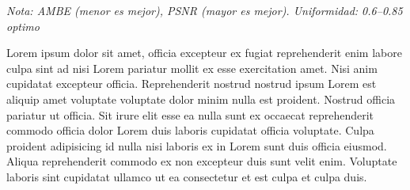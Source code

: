 \documentclass[sigchi]{acmart}
\begin{document}
\begin{table}[htbp]
	\centering
	\caption{Comparación estadística de los algoritmos de mejora de contraste}
	\label{tab:comparacion}
	\small

	\vspace{0.5em}
	\footnotesize%
	\textit{Nota: AMBE (menor es mejor), PSNR (mayor es mejor). Uniformidad: 0.6–0.85 optimo}
\end{table}

Lorem ipsum dolor sit amet, officia excepteur ex fugiat reprehenderit enim labore culpa sint ad
nisi Lorem pariatur mollit ex esse exercitation amet. Nisi anim cupidatat excepteur officia.
Reprehenderit nostrud nostrud ipsum Lorem est aliquip amet voluptate voluptate dolor minim
nulla est proident. Nostrud officia pariatur ut officia. Sit irure elit esse ea nulla sunt ex
occaecat reprehenderit commodo officia dolor Lorem duis laboris cupidatat officia voluptate.
Culpa proident adipisicing id nulla nisi laboris ex in Lorem sunt duis officia eiusmod. Aliqua
reprehenderit commodo ex non excepteur duis sunt velit enim. Voluptate laboris sint cupidatat
ullamco ut ea consectetur et est culpa et culpa duis.
\end{document}
